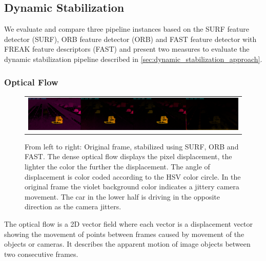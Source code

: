 \subsection{Dynamic Stabilization}
\label{sec:evaluation_dynamic_stabilization}
We evaluate and compare three pipeline instances based on the SURF \cite{bay10.1007/11744023_32,opencv_library} feature detector (SURF), 
ORB \cite{rublee6126544, opencv_library} feature detector (ORB) and FAST \cite{Ghahremani_2021,opencv_library} feature detector with FREAK \cite{alahi6247715,opencv_library} feature descriptors (FAST) 
and present two measures to evaluate the dynamic stabilization pipeline described in \autoref{sec:dynamic_stabilization_approach}.


\subsubsection{Optical Flow}
\label{sec:evaluation_dynamic_stabilization_optical_flow}
\begin{figure}[!ht]
    \centering
    \begin{tabular}{c}
      \includegraphics[width=0.95\linewidth]{images/frame_1317_cropped.png}    
    \end{tabular}
    \caption{
        From left to right: Original frame, stabilized using SURF, ORB and FAST.
        The dense optical flow displays the pixel displacement, the lighter the color the further the displacement. 
        The angle of displacement is color coded according to the HSV color circle.  
        In the original frame the violet background color indicates a jittery camera movement. 
        The car in the lower half is driving in the opposite direction as the camera jitters. 
    }
    \label{fig:optical_flow_example}
\end{figure}

The optical flow is a 2D vector field where each vector is a displacement vector showing the movement of points between frames caused by movement of the objects or cameras.
It describes the apparent motion of image objects between two consecutive frames. 

